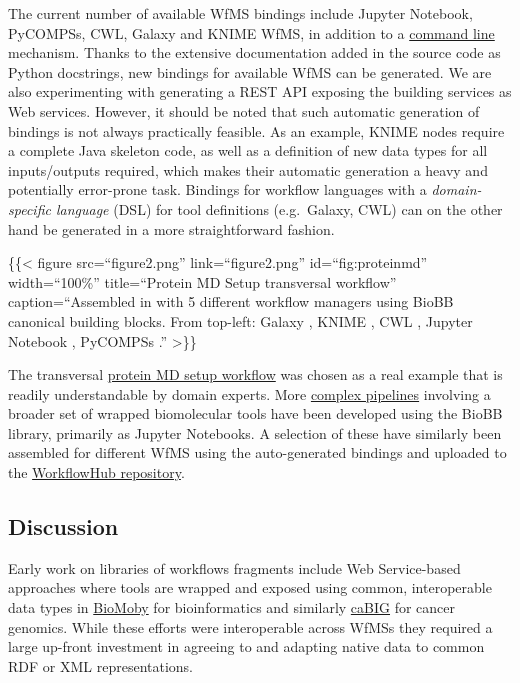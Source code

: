 The current number of available WfMS bindings include Jupyter Notebook,
PyCOMPSs, CWL, Galaxy and KNIME WfMS, in addition to a
\href{http://mmb.irbbarcelona.org/biobb/availability/tutorials/command-line}{command
line} mechanism. Thanks to the extensive documentation added in the
source code as Python docstrings, new bindings for available WfMS can be
generated. We are also experimenting with generating a REST API exposing
the building services as Web services. However, it should be noted that
such automatic generation of bindings is not always practically
feasible. As an example, KNIME nodes require a complete Java skeleton
code, as well as a definition of new data types for all inputs/outputs
required, which makes their automatic generation a heavy and potentially
error-prone task. Bindings for workflow languages with a
\emph{domain-specific language} (DSL) for tool definitions (e.g.~Galaxy,
CWL) can on the other hand be generated in a more straightforward
fashion.

\{\{\textless{} figure src=``figure2.png'' link=``figure2.png''
id=``fig:proteinmd'' width=``100\%'' title=``Protein MD Setup
transversal workflow'' caption=``Assembled in with 5 different workflow
managers using BioBB canonical building blocks. From top-left: Galaxy
\cite{ch6-22}, KNIME \cite{ch6-23}, CWL \cite{ch6-24}, Jupyter Notebook \cite{ch6-25},
PyCOMPSs \cite{ch6-26}.'' \textgreater\}\}

The transversal \href{https://workflowhub.eu/collections/3}{protein MD
setup workflow} was chosen as a real example that is readily
understandable by domain experts. More
\href{https://mmb.irbbarcelona.org/biobb/workflows}{complex pipelines}
involving a broader set of wrapped biomolecular tools have been
developed using the BioBB library, primarily as Jupyter Notebooks. A
selection of these have similarly been assembled for different WfMS
using the auto-generated bindings and uploaded to the
\href{https://workflowhub.eu/projects/11\#workflows}{WorkflowHub
repository}.

\hypertarget{discussion-1}{%
\subsection{Discussion}\label{discussion-1}}

Early work on libraries of workflows fragments include Web Service-based
approaches where tools are wrapped and exposed using common,
interoperable data types in \href{http://biomoby.open-bio.org/}{BioMoby}
\cite{ch6-27} for bioinformatics and similarly
\href{https://en.wikipedia.org/wiki/CaBIG}{caBIG} \cite{ch6-28} for cancer
genomics. While these efforts were interoperable across WfMSs they
required a large up-front investment in agreeing to and adapting native
data to common RDF or XML representations.

